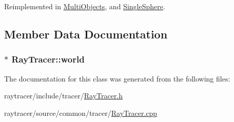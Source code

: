 Reimplemented in \hyperlink{class_multi_objects_aaa2b5692917976c50f7a9a33947a40cd}{Multi\-Objects}, and \hyperlink{class_single_sphere_a02d38b2285b90cb7e37325f65337dddb}{Single\-Sphere}.



\subsection{Member Data Documentation}
\hypertarget{class_ray_tracer_a0f6b1f71e4ba4aa387c8bffe0b916c1b}{
\subsubsection[{world}]{$\ast$ Ray\-Tracer\-::world\hspace{0.3cm}{\ttfamily [protected]}}}\label{class_ray_tracer_a0f6b1f71e4ba4aa387c8bffe0b916c1b}


The documentation for this class was generated from the following files\-:\begin{DoxyCompactItemize}
\item 
raytracer/include/tracer/\hyperlink{_ray_tracer_8h}{Ray\-Tracer.\-h}\item 
raytracer/source/common/tracer/\hyperlink{_ray_tracer_8cpp}{Ray\-Tracer.\-cpp}\end{DoxyCompactItemize}
